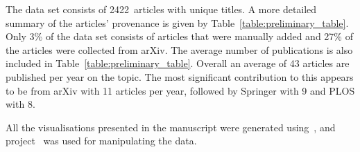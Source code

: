 \documentclass{article}
\theoremstyle{definition}
\newcommand{\totalarticles}{2422}
\begin{document}
The data set consists of \totalarticles~articles with unique
titles. A more detailed summary of the articles' provenance
is given by Table~\ref{table:preliminary_table}. Only 3\% of the data set consists of
articles that were manually added and 27\% of the articles were collected from
arXiv. The average number of publications is also included in
Table~\ref{table:preliminary_table}. Overall an average of 43 articles are published
per year on the topic. The most significant contribution to this appears to be
from arXiv with 11 articles per year, followed by Springer with 9 and PLOS with
8.

\begin{table}[!hbtp]
    \begin{center}
    \end{center}
    \caption{Summary of~\cite{pd_data_2018} per provenance.}
    \label{table:preliminary_table}
\end{table}

All the visualisations presented in the manuscript were generated
using~\cite{hunter2007matplotlib}, and project~\cite{walt2011numpy} was used for
manipulating the data.
\end{document}
